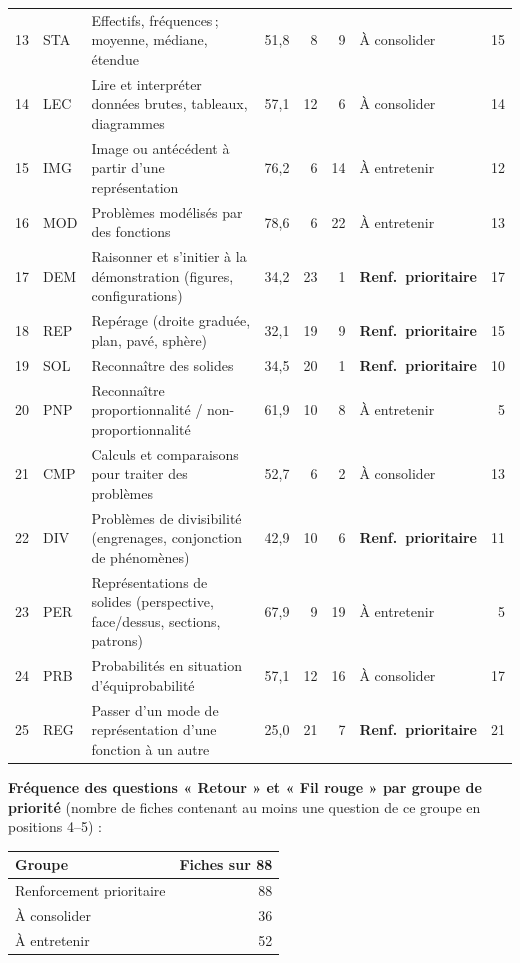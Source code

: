 {\begin{tabular}{@{}l l p{7.2cm} r r r l r@{}}
13 & STA & Effectifs, fréquences\,; moyenne, médiane, étendue & 51{,}8 & 8 & 9 & À consolider & 15 \\
14 & LEC & Lire et interpréter données brutes, tableaux, diagrammes & 57{,}1 & 12 & 6 & À consolider & 14 \\
15 & IMG & Image ou antécédent à partir d'une représentation & 76{,}2 & 6 & 14 & À entretenir & 12 \\
16 & MOD & Problèmes modélisés par des fonctions & 78{,}6 & 6 & 22 & À entretenir & 13 \\
17 & DEM & Raisonner et s'initier à la démonstration (figures, configurations) & 34{,}2 & 23 & 1 & \textbf{Renf.\ prioritaire} & 17 \\
18 & REP & Repérage (droite graduée, plan, pavé, sphère) & 32{,}1 & 19 & 9 & \textbf{Renf.\ prioritaire} & 15 \\
19 & SOL & Reconnaître des solides & 34{,}5 & 20 & 1 & \textbf{Renf.\ prioritaire} & 10 \\
20 & PNP & Reconnaître proportionnalité / non-proportionnalité & 61{,}9 & 10 & 8 & À entretenir & 5 \\
21 & CMP & Calculs et comparaisons pour traiter des problèmes & 52{,}7 & 6 & 2 & À consolider & 13 \\
22 & DIV & Problèmes de divisibilité (engrenages, conjonction de phénomènes) & 42{,}9 & 10 & 6 & \textbf{Renf.\ prioritaire} & 11 \\
23 & PER & Représentations de solides (perspective, face/dessus, sections, patrons) & 67{,}9 & 9 & 19 & À entretenir & 5 \\
24 & PRB & Probabilités en situation d'équiprobabilité & 57{,}1 & 12 & 16 & À consolider & 17 \\
25 & REG & Passer d'un mode de représentation d'une fonction à un autre & 25{,}0 & 21 & 7 & \textbf{Renf.\ prioritaire} & 21 \\
\bottomrule\end{tabular}}\par\bigskip
\textbf{Fréquence des questions « Retour » et « Fil rouge » par groupe de priorité} (nombre de fiches contenant au moins une question de ce groupe en positions 4–5) :\par\smallskip
\begin{tabular}{@{}l r@{}}\toprule Groupe & Fiches sur 88 \\ \midrule
Renforcement prioritaire & 88 \\
À consolider & 36 \\
À entretenir & 52 \\
\bottomrule\end{tabular}\par